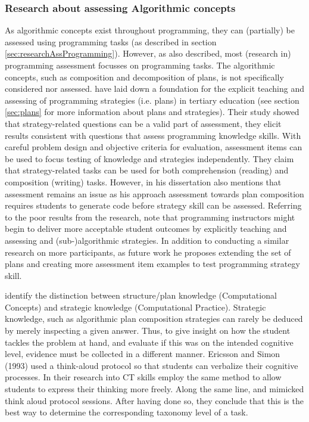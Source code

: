 \subsubsection{Research about assessing Algorithmic concepts}
As algorithmic concepts exist throughout programming, they can (partially) be assessed using programming tasks (as described in section \ref{sec:researchAssProgramming}). However, as also described, most (research in) programming assessment focusses on programming tasks. The algorithmic concepts, such as composition and decomposition of plans, is not specifically considered nor assessed.  have laid down a foundation for the explicit teaching and assessing of programming strategies (i.e. plans) in tertiary education (see section \ref{sec:plans} for more information about plans and strategies). Their study showed that strategy-related questions can be a valid part of assessment, they elicit results consistent with questions that assess programming knowledge skills. With careful problem design and objective criteria for evaluation, assessment items can be used to focus testing of knowledge and strategies independently. They claim that strategy-related tasks can be used for both comprehension (reading) and composition (writing) tasks. However, in his dissertation \citeauthor{deRaadt2008} also mentions that assessment remains an issue as his approach assessment towards plan composition requires students to generate code before strategy skill can be assessed. Referring to the poor results from the  research,  note that programming instructors might begin to deliver more acceptable student outcomes by explicitly teaching and assessing and (sub-)algorithmic strategies. In addition to conducting a similar research on more participants, as future work he proposes extending the set of plans and creating more assessment item examples to test programming strategy skill.



\cite{BrennanResnick2012} identify the distinction between structure/plan knowledge (Computational Concepts) and strategic knowledge (Computational Practice). Strategic knowledge, such as algorithmic plan composition strategies can rarely be deduced by merely inspecting a given answer. Thus, to give insight on how the student tackles the problem at hand, and evaluate if this was on the intended cognitive level, evidence must be collected in a different manner.  Ericsson and Simon (1993) used a think-aloud protocol so that students can verbalize their cognitive processes. In their research into CT skills  employ the same method to allow students to express their thinking more freely. Along the same line,  and  mimicked  think aloud protocol sessions. After having done so, they conclude that this is the best way to determine the corresponding taxonomy level of a task.



